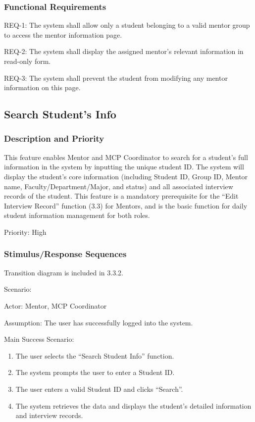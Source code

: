 \subsubsection{Functional Requirements}

REQ-1: The system shall allow only a student belonging to a valid mentor group to access the mentor information page.

REQ-2: The system shall display the assigned mentor's relevant information in read-only form.

REQ-3: The system shall prevent the student from modifying any mentor information on this page.

\subsection{Search Student's Info}

\subsubsection{Description and Priority}

This feature enables Mentor and MCP Coordinator to search for a student's full information in the system by inputting the unique student ID. The system will display the student's core information (including Student ID, Group ID, Mentor name, Faculty/Department/Major, and status) and all associated interview records of the student. This feature is a mandatory prerequisite for the ``Edit Interview Record'' function (3.3) for Mentors, and is the basic function for daily student information management for both roles.

Priority: High

\subsubsection{Stimulus/Response Sequences}

Transition diagram is included in 3.3.2.

Scenario:

Actor: Mentor, MCP Coordinator

Assumption: The user has successfully logged into the system.

Main Success Scenario:
\begin{enumerate}
\item The user selects the ``Search Student Info'' function.
\item The system prompts the user to enter a Student ID.
\item The user enters a valid Student ID and clicks ``Search''.
\item The system retrieves the data and displays the student's detailed information and interview records.
\end{enumerate}


